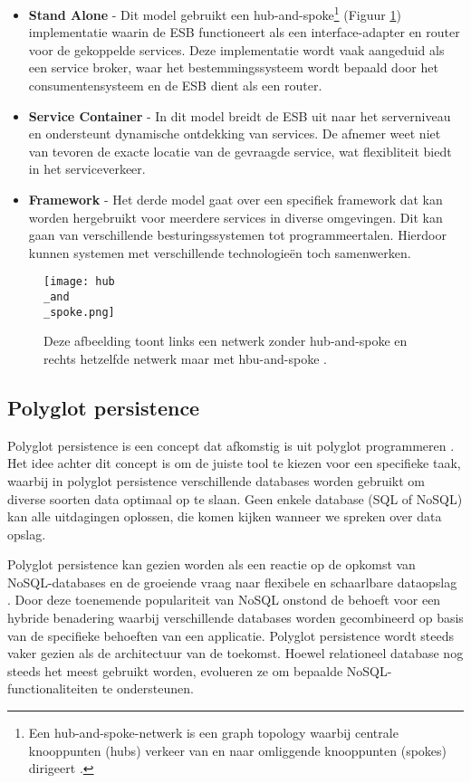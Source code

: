 \begin{itemize}
	\item \textbf{Stand Alone} - Dit model gebruikt een hub-and-spoke\footnote{Een hub-and-spoke-netwerk is een graph topology waarbij centrale knooppunten (hubs) verkeer van en naar omliggende knooppunten (spokes) dirigeert \autocite{Khosravi2024}.} (Figuur \ref{fig:hub-and-spoke}) implementatie waarin de ESB functioneert als een interface-adapter en router voor de gekoppelde services. Deze implementatie wordt vaak aangeduid als een service broker, waar het bestemmingssysteem wordt bepaald door het consumentensysteem en de ESB dient als een router.
	\item \textbf{Service Container} - In dit model breidt de ESB uit naar het serverniveau en ondersteunt dynamische ontdekking van services. De afnemer weet niet van tevoren de exacte locatie van de gevraagde service, wat flexibliteit biedt in het serviceverkeer.
	\item \textbf{Framework} - Het derde model gaat over een specifiek framework dat kan worden hergebruikt voor meerdere services in diverse omgevingen. Dit kan gaan van verschillende besturingssystemen tot programmeertalen. Hierdoor kunnen systemen met verschillende technologieën toch samenwerken.
\end{itemize}

\begin{figure}[H]
	\centering
	\texttt{[image: hub\\\_and\\\_spoke.png]}
	\caption[Voorstelling van een hub-and-spoke]{\label{fig:hub-and-spoke}Deze afbeelding toont links een netwerk zonder hub-and-spoke en rechts hetzelfde netwerk maar met hbu-and-spoke \autocite{Zhou2021}.}
\end{figure}

\subsection{Polyglot persistence}
\label{sec:Polyglot Persistence}

Polyglot persistence is een concept dat afkomstig is uit polyglot programmeren \autocite{Kazanavicius2022}. Het idee achter dit concept is om de juiste tool te kiezen voor een specifieke taak, waarbij in polyglot persistence verschillende databases worden gebruikt om diverse soorten data optimaal op te slaan. Geen enkele database (SQL of NoSQL) kan alle uitdagingen oplossen, die komen kijken wanneer we spreken over data opslag.

Polyglot persistence kan gezien worden als een reactie op de opkomst van NoSQL-databases en de groeiende vraag naar flexibele en schaarlbare dataopslag \autocite{Candel2022}. Door deze toenemende populariteit van NoSQL onstond de behoeft voor een hybride benadering waarbij verschillende databases worden gecombineerd op basis van de specifieke behoeften van een applicatie. Polyglot persistence wordt steeds vaker gezien als de architectuur van de toekomst. Hoewel relationeel database nog steeds het meest gebruikt worden, evolueren ze om bepaalde NoSQL-functionaliteiten te ondersteunen.

